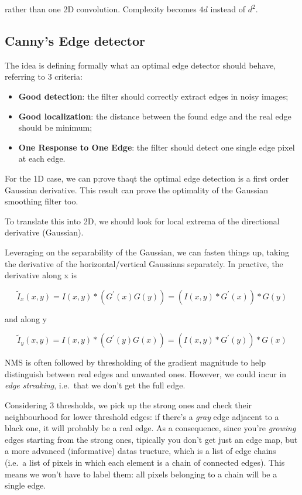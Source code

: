 \documentclass{article}
\begin{document}
rather than one 2D convolution. Complexity becomes \(4d\) instead of
\(d^2\).

\subsection{Canny's Edge detector}\label{cannys-edge-detector}

The idea is defining formally what an optimal edge detector should
behave, referring to 3 criteria:

\begin{itemize}
\item
  \textbf{Good detection}: the filter should correctly extract edges in
  noisy images;
\item
  \textbf{Good localization}: the distance between the found edge and
  the real edge should be minimum;
\item
  \textbf{One Response to One Edge}: the filter should detect one single
  edge pixel at each edge.
\end{itemize}

For the 1D case, we can p;rove thaqt the optimal edge detection is a
first order Gaussian derivative. This result can prove the optimality of
the Gaussian smoothing filter too.

To translate this into 2D, we should look for local extrema of the
directional derivative (Gaussian).

Leveraging on the separability of the Gaussian, we can fasten things up,
taking the derivative of the horizontal/vertical Gaussians separately.
In practive, the derivative along x is

\[\tilde{I}_{x}(x, y)=I(x, y) *\left(G^{\prime}(x) G(y)\right)=\left(I(x, y) * G^{\prime}(x)\right) * G(y)\]

and along y

\[\tilde{I}_{y}(x, y)=I(x, y) *\left(G^{\prime}(y) G(x)\right)=\left(I(x, y) * G^{\prime}(y)\right) * G(x)\]

NMS is often followed by thresholding of the gradient magnitude to help
distinguish between real edges and unwanted ones. However, we could
incur in \emph{edge streaking}, i.e.~that we don't get the full edge.

Considering 3 thresholds, we pick up the strong ones and check their
neighbourhood for lower threshold edges: if there's a \emph{gray} edge
adjacent to a black one, it will probably be a real edge. As a
consequence, since you're \emph{growing} edges starting from the strong
ones, tipically you don't get just an edge map, but a more advanced
(informative) datas tructure, which is a list of edge chains (i.e.~a
list of pixels in which each element is a chain of connected edges).
This means we won't have to label them: all pixels belonging to a chain
will be a single edge.
\end{document}
